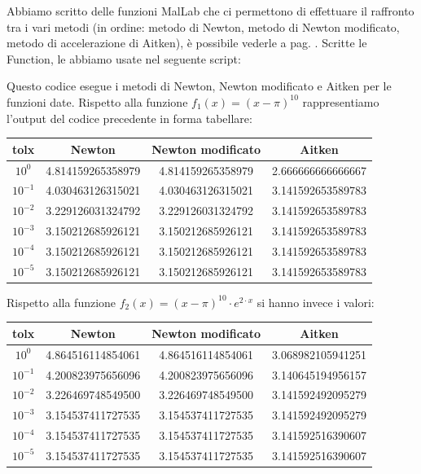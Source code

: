 \begin{flushleft}
Abbiamo scritto delle funzioni MalLab che ci permettono di effettuare il raffronto tra i vari metodi (in ordine: metodo di Newton, metodo di Newton modificato, metodo di accelerazione di Aitken), è possibile vederle a pag. \pageref{functcap2}. Scritte le Function, le abbiamo usate nel seguente script: 

Questo codice esegue i metodi di Newton, Newton modificato e Aitken per le funzioni date. Rispetto alla funzione $f_1(x)=(x-\pi)^{10}$ rappresentiamo l'output del codice precedente in forma tabellare: 
\begin{center}
\begin{tabular}{|c|c|c|c|}
\hline
tolx & Newton & Newton modificato & Aitken \\
\hline
$10^{0}$ & 4.814159265358979 & 4.814159265358979 & 2.666666666666667 \\
$10^{-1}$ & 4.030463126315021 & 4.030463126315021 & 3.141592653589783 \\
$10^{-2}$ & 3.229126031324792 & 3.229126031324792 & 3.141592653589783 \\
$10^{-3}$ & 3.150212685926121 &  3.150212685926121 &  3.141592653589783 \\ 
$10^{-4}$ & 3.150212685926121 & 3.150212685926121 & 3.141592653589783 \\
$10^{-5}$ & 3.150212685926121 & 3.150212685926121 & 3.141592653589783 \\
\hline
\end{tabular}
\end{center}
Rispetto alla funzione $f_2(x) = (x-\pi)^{10} \cdot e^{2\cdot x}$ si hanno invece i valori:
\begin{center}
\begin{tabular}{|c|c|c|c|}
\hline
tolx & Newton & Newton modificato & Aitken \\
\hline
$10^{0}$ & 4.864516114854061 & 4.864516114854061 & 3.068982105941251 \\
$10^{-1}$ & 4.200823975656096 & 4.200823975656096 & 3.140645194956157 \\
$10^{-2}$ & 3.226469748549500 & 3.226469748549500 & 3.141592492095279 \\
$10^{-3}$ & 3.154537411727535 & 3.154537411727535 &  3.141592492095279 \\ 
$10^{-4}$ & 3.154537411727535 & 3.154537411727535 & 3.141592516390607 \\
$10^{-5}$ & 3.154537411727535 & 3.154537411727535 & 3.141592516390607 \\

\end{tabular}
\end{center}
\end{flushleft}
